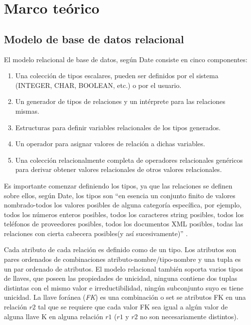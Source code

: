 \documentclass[letterpaper]{article}
\begin{document}
\section {Marco teórico}
\subsection {Modelo de base de datos relacional}
El modelo relacional de base de datos, según Date \cite{date12} consiste en cinco componentes:
\begin{enumerate}
    \item Una colección de tipos escalares, pueden ser definidos por el sistema (INTEGER, CHAR, BOOLEAN, etc.) o por el usuario.
    \item Un generador de tipos de relaciones y un intérprete para las relaciones mismas.
    \item Estructuras para definir variables relacionales de los tipos generados.
    \item Un operador para asignar valores de relación a dichas variables.
    \item Una colección relacionalmente completa de operadores relacionales genéricos para derivar obtener valores relacionales de otros valores relacionales.
\end{enumerate}
Es importante comenzar definiendo los tipos, ya que las relaciones se definen sobre ellos, según Date, los tipos son ``en esencia un conjunto finito de valores nombrado-todos los valores posibles de alguna categoría específica, por ejemplo, todos los números enteros posibles, todos los caracteres string posibles, todos los teléfonos de proveedores posibles, todos los documentos XML posibles, todas las relaciones con cierta cabecera posibles(y así sucesivamente)'' \cite{date12}.

Cada atributo de cada relación es definido como de un tipo. Los atributos son pares ordenados de combinaciones atributo-nombre/tipo-nombre y una tupla es un par ordenado de atributos.
El modelo relacional también soporta varios tipos de llaves, que poseen las propiedades de unicidad, ninguna contiene dos tuplas distintas con el mismo valor e irreductibilidad, ningún subconjunto suyo es tiene unicidad. La llave foránea (\emph{FK}) es una combinación o set se atributos FK en una relación $r2$ tal que se requiere que cada valor FK sea igual a algún valor de alguna llave K en alguna relación $r1$ ($r1$ y $r2$ no son necesariamente distintos).
\end{document}
